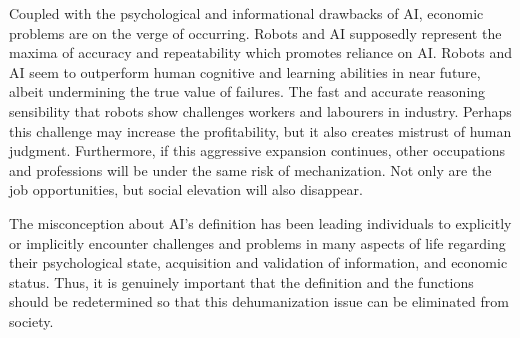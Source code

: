 \documentclass[man]{apa6}
\begin{document}
Coupled with the psychological and informational drawbacks of AI, economic problems are on the verge of occurring. Robots and AI supposedly represent the maxima of accuracy and repeatability which promotes reliance on AI. Robots and AI seem to outperform human cognitive and learning abilities in near future, albeit undermining the true value of failures. The fast and accurate reasoning sensibility that robots show challenges workers and labourers in industry. Perhaps this challenge may increase the profitability, but it also creates mistrust of human judgment. Furthermore, if this aggressive expansion continues, other occupations and professions will be under the same risk of mechanization. Not only are the job opportunities, but social elevation will also disappear. \par
The misconception about AI's definition has been leading individuals to explicitly or implicitly encounter challenges and problems in many aspects of life regarding their psychological state, acquisition and validation of information, and economic status. Thus, it is genuinely important that the definition and the functions should be redetermined so that this dehumanization issue can be eliminated from society.


\end{document}
